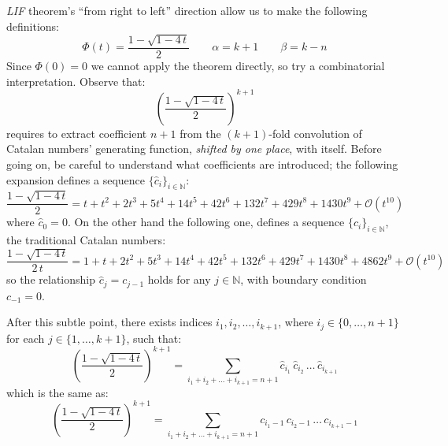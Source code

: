 \emph{LIF} theorem's ``from right to left'' direction allow us to make 
the following definitions:
\begin{displaymath}
    \Phi(t)=\frac{1-\sqrt{1-4\,t}}{2}\qquad \alpha=k+1\qquad \beta=k-n
\end{displaymath}
Since $\Phi(0)=0$ we cannot apply the theorem directly, so try
a combinatorial interpretation. Observe that:
\begin{displaymath}
    [t^{n+1}] \left(\frac{1-\sqrt{1-4\,t}}{2}\right)^{k+1} 
\end{displaymath}
requires to extract coefficient $n+1$ from the $(k+1)$-fold
convolution of Catalan numbers' generating function, \emph{shifted
by one place}, with itself. Before going on, be careful
to understand what coefficients are introduced; the
following expansion defines a sequence $\lbrace \hat{c}_{i}\rbrace_{i\in\mathbb{N}}$:
\begin{displaymath}
    \frac{1-\sqrt{1-4\,t}}{2} = t + t^{2} + 2 t^{3} + 5 t^{4} 
        + 14 t^{5} + 42 t^{6} + 132 t^{7} + 429 t^{8} + 1430 t^{9} 
        + \mathcal{O}\left(t^{10}\right)
\end{displaymath}
where $\hat{c}_{0}=0$. On the other hand the following one, defines a sequence 
$\lbrace c_{i}\rbrace_{i\in\mathbb{N}}$, the traditional Catalan numbers:
\begin{displaymath}
    \frac{1-\sqrt{1-4\,t}}{2\,t} = 1 + t + 2 t^{2} + 5 t^{3} + 14 t^{4} 
        + 42 t^{5} + 132 t^{6} + 429 t^{7} + 1430 t^{8} + 4862 t^{9} 
        + \mathcal{O}\left(t^{10}\right)
\end{displaymath}
so the relationship $\hat{c}_{j} = c_{j-1}$ holds for any $j\in\mathbb{N}$, 
with boundary condition $c_{-1}=0$. 

After this subtle point, there exists indices $i_{1}, i_{2}, \ldots, i_{k+1}$,
where $i_{j}\in\lbrace0,\ldots,n+1\rbrace$ for each $j\in\lbrace1,\ldots,k+1\rbrace$, 
such that:
\begin{displaymath}
    [t^{n+1}] \left(\frac{1-\sqrt{1-4\,t}}{2}\right)^{k+1} 
        = \sum_{i_{1}+ i_{2}+ \ldots+ i_{k+1}=n+1}{
            \hat{c}_{i_{1}}\,\hat{c}_{i_{2}}\,\ldots\,\hat{c}_{i_{k+1}} }
\end{displaymath}
which is the same as:
\begin{displaymath}
    [t^{n+1}] \left(\frac{1-\sqrt{1-4\,t}}{2}\right)^{k+1} 
        = \sum_{i_{1}+ i_{2}+ \ldots+ i_{k+1}=n+1}{
            c_{i_{1}-1}\,c_{i_{2}-1}\,\ldots\,c_{i_{k+1}-1} }
\end{displaymath}

